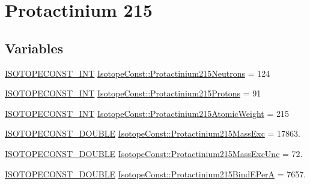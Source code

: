 \hypertarget{group___isotope_const-_protactinium-_pa215}{}\section{Protactinium 215}
\label{group___isotope_const-_protactinium-_pa215}
\subsection*{Variables}
\begin{DoxyCompactItemize}
\item 
\mbox{\hyperlink{group___isotope_const-_macros_ga5f18360b3e99483a35c32d789e62621c}{I\+S\+O\+T\+O\+P\+E\+C\+O\+N\+S\+T\+\_\+\+I\+NT}} \mbox{\hyperlink{group___isotope_const-_protactinium-_pa215_ga0b0e98ce8e8d0fbf95ad007c3270bd8f}{Isotope\+Const\+::\+Protactinium215\+Neutrons}} = 124
\item 
\mbox{\hyperlink{group___isotope_const-_macros_ga5f18360b3e99483a35c32d789e62621c}{I\+S\+O\+T\+O\+P\+E\+C\+O\+N\+S\+T\+\_\+\+I\+NT}} \mbox{\hyperlink{group___isotope_const-_protactinium-_pa215_gae4065437ca8e1b74df6117d09800fc3c}{Isotope\+Const\+::\+Protactinium215\+Protons}} = 91
\item 
\mbox{\hyperlink{group___isotope_const-_macros_ga5f18360b3e99483a35c32d789e62621c}{I\+S\+O\+T\+O\+P\+E\+C\+O\+N\+S\+T\+\_\+\+I\+NT}} \mbox{\hyperlink{group___isotope_const-_protactinium-_pa215_ga0495afdea4b1ef2355c9db5149e1e238}{Isotope\+Const\+::\+Protactinium215\+Atomic\+Weight}} = 215
\item 
\mbox{\hyperlink{group___isotope_const-_macros_ga8f45a7272ce02c0b4c65c44636ed719a}{I\+S\+O\+T\+O\+P\+E\+C\+O\+N\+S\+T\+\_\+\+D\+O\+U\+B\+LE}} \mbox{\hyperlink{group___isotope_const-_protactinium-_pa215_gaf21ef663add22c9dd00a44212d03923d}{Isotope\+Const\+::\+Protactinium215\+Mass\+Exc}} = 17863.
\item 
\mbox{\hyperlink{group___isotope_const-_macros_ga8f45a7272ce02c0b4c65c44636ed719a}{I\+S\+O\+T\+O\+P\+E\+C\+O\+N\+S\+T\+\_\+\+D\+O\+U\+B\+LE}} \mbox{\hyperlink{group___isotope_const-_protactinium-_pa215_gafc510cc6cb1872fe1ebd06f8f9adff60}{Isotope\+Const\+::\+Protactinium215\+Mass\+Exc\+Unc}} = 72.
\item 
\mbox{\hyperlink{group___isotope_const-_macros_ga8f45a7272ce02c0b4c65c44636ed719a}{I\+S\+O\+T\+O\+P\+E\+C\+O\+N\+S\+T\+\_\+\+D\+O\+U\+B\+LE}} \mbox{\hyperlink{group___isotope_const-_protactinium-_pa215_gadc7a98071e820595c5b38319fa8db065}{Isotope\+Const\+::\+Protactinium215\+Bind\+E\+PerA}} = 7657.

\end{DoxyCompactItemize}
